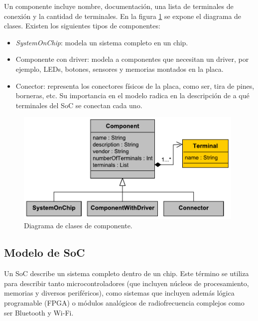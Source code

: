 Un componente incluye nombre, documentación, una lista de terminales de conexión y la cantidad de terminales. En la figura \ref{fig:Component} se expone el diagrama de clases. Existen los siguientes tipos de componentes:

\begin{itemize}
\item
\emph{SystemOnChip}: modela un sistema completo en un chip.
\item
Componente con driver: modela a componentes que necesitan un driver, por ejemplo, LEDs, botones, sensores y memorias montados en la placa.
\item
Conector: representa los conectores físicos de la placa, como ser, tira de pines, borneras, etc. Su importancia en el modelo radica en la descripción de a qué terminales del SoC se conectan cada uno.
\end{itemize}

\begin{figure}[!htbp]
\begin{center}  %
\includegraphics*[width=11cm]{Figures/Component.pdf}
\par\caption{Diagrama de clases de componente.}\label{fig:Component}
\end{center}
\end{figure}

\subsection{Modelo de SoC}
\label{sec:modelSoC}

Un SoC describe un sistema completo dentro de un chip. Este término se utiliza para describir tanto microcontroladores (que incluyen núcleos de procesamiento, memorias y diversos periféricos), como sistemas que incluyen además lógica programable (FPGA) o módulos analógicos de radiofrecuencia complejos como ser Bluetooth y Wi-Fi.

